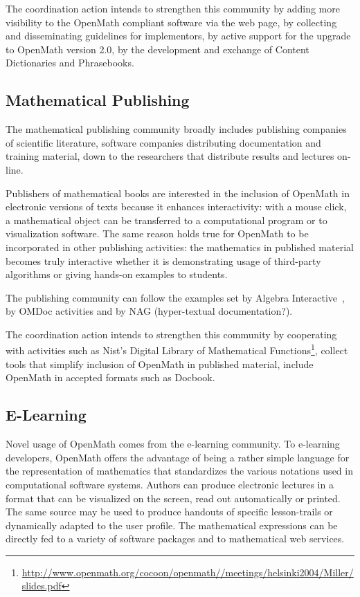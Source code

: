 \documentclass[draft]{artikel3}
\begin{document}
The coordination action intends to strengthen this community by adding
more visibility to the OpenMath compliant software via the web page,
by collecting and disseminating guidelines for implementors, by active
support for the upgrade to OpenMath version 2.0, by the development
and exchange of Content Dictionaries and Phrasebooks.

\subsection{Mathematical Publishing}
\label{sec:mpubl}

The mathematical publishing community broadly includes publishing
companies of scientific literature, software companies distributing
documentation and training material, down to the researchers that
distribute results and lectures on-line.

Publishers of mathematical books are interested in the inclusion of
OpenMath in electronic versions of texts because it enhances
interactivity: with a mouse click, a mathematical object can be
transferred to a computational program or to visualization software.
The same reason holds true for OpenMath to be incorporated in other
publishing activities: the mathematics in published material becomes
truly interactive whether it is demonstrating usage of third-party
algorithms or giving hands-on examples to students.

The publishing community can follow the examples set by Algebra
Interactive~\cite{ida}, by OMDoc activities\cite{OMDOC} and by NAG
(hyper-textual documentation?).

The coordination action intends to strengthen this community by
cooperating with activities such as Nist's Digital Library of
Mathematical
Functions\footnote{\url{http://www.openmath.org/cocoon/openmath//meetings/helsinki2004/Miller/slides.pdf}},
collect tools that simplify inclusion of OpenMath in published
material, include OpenMath in accepted formats such as Docbook.


\subsection{E-Learning}
\label{sec:e-learn}
Novel usage of OpenMath comes from the e-learning community. To
e-learning developers, OpenMath offers the advantage of being a rather
simple language for the representation of mathematics that
standardizes the various notations used in computational software
systems. Authors can produce electronic lectures in a format that can
be visualized on the screen, read out automatically or printed. The
same source may be used to produce handouts of specific lesson-trails
or dynamically adapted to the user profile. The mathematical
expressions can be directly fed to a variety of software packages and
to mathematical web services.
\end{document}

